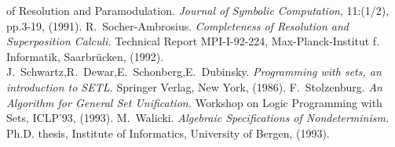 \begin{thebibliography}{MM99}
   of Resolution and Paramodulation. {\em Journal of Symbolic Computation}, 
   11:(1/2), pp.3-19, (1991).
 R.~Socher-Ambrosius. 
   {\em Completeness of Resolution and Superposition Calculi.}
   Technical Report
   MPI-I-92-224, Max-Planck-Institut f. Informatik, Saarbr\"ucken, (1992).
 J.~Schwartz,R.~Dewar,E.~Schonberg,E.~Dubinsky. 
   {\em Programming with sets, an introduction to SETL. }
   Springer Verlag, New York, (1986).
 F.~Stolzenburg. 
   {\em An Algorithm for General Set Unification.}
   Workshop on Logic Programming with Sets, ICLP'93, (1993).
 M.~Walicki. 
   {\em Algebraic Specifications of Nondeterminism.}
   Ph.D. thesis, Institute of Informatics, University of Bergen, (1993).
\end{thebibliography} 



